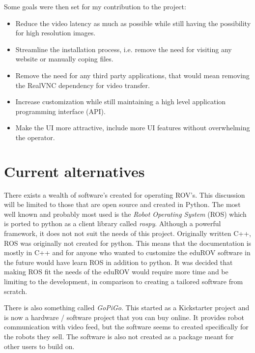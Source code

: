 Some goals were then set for my contribution to the project:

\begin{itemize}
\item Reduce the video latency as much as possible while still having the possibility for high resolution images.

\item Streamline the installation process, i.e. remove the need for visiting any website or manually coping files.

\item Remove the need for any third party applications, that would mean removing the RealVNC dependency for video transfer.

\item Increase customization while still maintaining a high level application programming interface (API).

\item Make the UI more attractive, include more UI features without overwhelming the operator.
\end{itemize}

\section{Current alternatives}

There exists a wealth of software's created for operating ROV's. This discussion will be limited to those that are open source and created in Python. The most well known and probably most used is the \emph{Robot Operating System} (ROS) which is ported to python as a client library called \emph{rospy}. Although a powerful framework, it does not not suit the needs of this project. Originally written C++, ROS was originally not created for python. This means that the documentation is mostly in C++ and for anyone who wanted to customize the eduROV software in the future would have learn ROS in addition to python. It was decided that making ROS fit the needs of the eduROV would require more time and be limiting to the development, in comparison to creating a tailored software from scratch.

There is also something called \emph{GoPiGo}. This started as a Kickstarter project and is now a hardware / software project that you can buy online. It provides robot communication with video feed, but the software seems to created specifically for the robots they sell. The software is also not created as a package meant for other users to build on.

